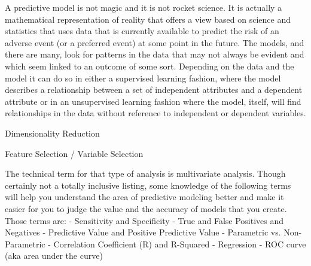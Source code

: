 A predictive model is not magic and it is not rocket science. It is actually a mathematical representation
of reality that offers a view based on science and statistics that uses data that is currently available to
predict the risk of an adverse event (or a preferred event) at some point in the future. The models, and
there are many, look for patterns in the data that may not always be evident and which seem linked to
an outcome of some sort. Depending on the data and the model it can do so in either a supervised
learning fashion, where the model describes a relationship between a set of independent attributes and
a dependent attribute or in an unsupervised learning fashion where the model, itself, will find
relationships in the data without reference to independent or dependent variables.



Dimensionality Reduction

Feature Selection / Variable Selection




The technical term for that type of analysis is multivariate analysis. Though certainly not a
totally inclusive listing, some knowledge of the following terms will help you understand the area of
predictive modeling better and make it easier for you to judge the value and the accuracy of models that
you create. Those terms are:
- Sensitivity and Specificity
- True and False Positives and Negatives
- Predictive Value and Positive Predictive Value
- Parametric vs. Non-Parametric
- Correlation Coefficient (R) and R-Squared
- Regression
- ROC curve (aka area under the curve)
